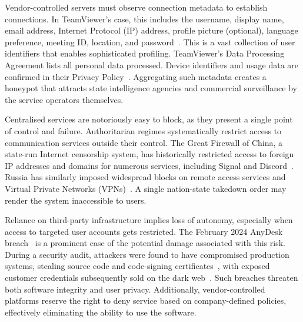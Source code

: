\documentclass[12pt,a4paper,oneside]{report}
\begin{document}
\begin{description}[style=nextline]

\item[Privacy Erosion]
Vendor-controlled servers must observe connection metadata to establish connections. In TeamViewer's case, this includes the username, display name, email address, Internet Protocol (IP) address, profile picture (optional), language preference, meeting ID, location, and password~\cite{teamviewerdpa}. This is a vast collection of user identifiers that enables sophisticated profiling. TeamViewer's Data Processing Agreement lists all personal data processed. Device identifiers and usage data are confirmed in their Privacy Policy~\cite{teamviewerprivacy}. Aggregating such metadata creates a honeypot that attracts state intelligence agencies and commercial surveillance by the service operators themselves.

\item[Censorship Vulnerability]
Centralised services are notoriously easy to block, as they present a single point of control and failure. Authoritarian regimes systematically restrict access to communication services outside their control. The Great Firewall of China, a state-run Internet censorship system, has historically restricted access to foreign IP addresses and domains for numerous services, including Signal and Discord~\cite{signalchina,discordchina}. Russia has similarly imposed widespread blocks on remote access services and Virtual Private Networks (VPNs)~\cite{reutersvpn,roskomnadzor}. A single nation-state takedown order may render the system inaccessible to users.

\item[Operational Dependency]
Reliance on third-party infrastructure implies loss of autonomy, especially when access to targeted user accounts gets restricted. The February 2024 AnyDesk breach~\cite{anydesk2024} is a prominent case of the potential damage associated with this risk. During a security audit, attackers were found to have compromised production systems, stealing source code and code-signing certificates~\cite{akamaianydesk,cyberreasonanydesk}, with exposed customer credentials subsequently sold on the dark web~\cite{resecurityanydesk,secboulevardanydesk}. Such breaches threaten both software integrity and user privacy. Additionally, vendor-controlled platforms reserve the right to deny service based on company-defined policies, effectively eliminating the ability to use the software.

\end{description}
\end{document}
